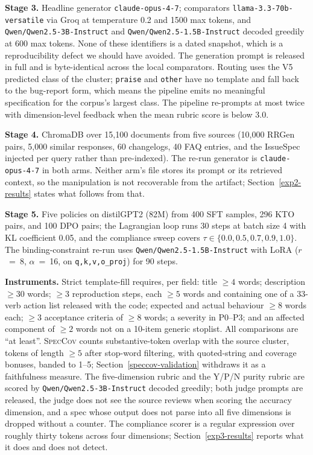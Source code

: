 \documentclass[preprint,12pt]{elsarticle}
\begin{document}
  \textbf{Stage 3.} Headline generator \texttt{claude-opus-4-7}; comparators
  \texttt{llama-3.3-70b-versatile} via Groq at temperature 0.2 and 1500 max tokens, and
  \texttt{Qwen/Qwen2.5-3B-Instruct} and \texttt{Qwen/Qwen2.5-1.5B-Instruct} decoded greedily at
  600 max tokens. None of these identifiers is a dated snapshot, which is a reproducibility defect
  we should have avoided. The generation prompt is released in full and is byte-identical across
  the local comparators. Routing uses the V5 predicted class of the cluster; \texttt{praise} and
  \texttt{other} have no template and fall back to the bug-report form, which means the pipeline
  emits no meaningful specification for the corpus's largest class. The pipeline re-prompts at
  most twice with dimension-level feedback when the mean rubric score is below 3.0.

  \textbf{Stage 4.} ChromaDB over 15{,}100 documents from five sources (10{,}000 RRGen pairs,
  5{,}000 similar responses, 60 changelogs, 40 FAQ entries, and the IssueSpec injected per query
  rather than pre-indexed). The re-run generator is \texttt{claude-opus-4-7} in both arms. Neither
  arm's file stores its prompt or its retrieved context, so the manipulation is not recoverable
  from the artifact; Section~\ref{exp2-results} states what follows from that.

  \textbf{Stage 5.} Five policies on distilGPT2 (82M) from 400 SFT samples, 296 KTO pairs, and 100
  DPO pairs; the Lagrangian loop runs 30 steps at batch size 4 with KL coefficient 0.05, and the
  compliance sweep covers $\tau \in \{0.0, 0.5, 0.7, 0.9, 1.0\}$. The binding-constraint re-run
  uses \texttt{Qwen/Qwen2.5-1.5B-Instruct} with LoRA ($r$~=~8, $\alpha$~=~16, on
  \texttt{q,k,v,o\_proj}) for 90 steps.

  \textbf{Instruments.} Strict template-fill requires, per field: title $\geq 4$ words;
  description $\geq 30$ words; $\geq 3$ reproduction steps, each $\geq 5$ words and containing one
  of a 33-verb action list released with the code; expected and actual behaviour $\geq 8$ words
  each; $\geq 3$ acceptance criteria of $\geq 8$ words; a severity in P0--P3; and an affected
  component of $\geq 2$ words not on a 10-item generic stoplist. All comparisons are
  ``at least''. \textsc{SpecCov} counts substantive-token overlap with the source cluster, tokens
  of length $\geq 5$ after stop-word filtering, with quoted-string and coverage bonuses, banded to
  1--5; Section~\ref{speccov-validation} withdraws it as a faithfulness measure. The
  five-dimension rubric and the Y/P/N purity rubric are scored by
  \texttt{Qwen/Qwen2.5-3B-Instruct} decoded greedily; both judge prompts are released, the judge
  does not see the source reviews when scoring the accuracy dimension, and a spec whose output
  does not parse into all five dimensions is dropped without a counter. The compliance scorer is a
  regular expression over roughly thirty tokens across four dimensions; Section~\ref{exp3-results}
  reports what it does and does not detect.
\end{document}
